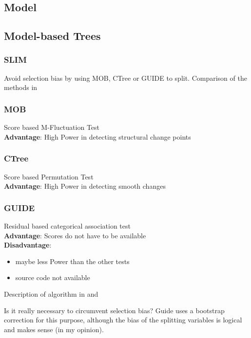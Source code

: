 \subsection{Model}

\subsection{Model-based Trees}
\subsubsection{SLIM}
Avoid selection bias by using MOB, CTree or GUIDE to split.
Comparison of the methods in \citep{Schlosser.24.06.2019}

\subsubsection{MOB}
Score based M-Fluctuation Test \\
\textbf{Advantage}: High Power in detecting structural change points

\subsubsection{CTree}
Score based Permutation Test \\
\textbf{Advantage}: High Power in detecting smooth changes

\subsubsection{GUIDE}
Residual based categorical association test\\
\textbf{Advantage}: Scores do not have to be available\\
\textbf{Disadvantage}: 
\begin{itemize}
    \item maybe less Power than the other tests
    \item source code not available \citep{Loh.2014}
\end{itemize}

Description of algorithm in \citep{Loh.2009} and \citep{.2002}

Is it really necessary to circumvent selection bias? Guide uses a bootstrap correction for this purpose, although the bias of the splitting variables is logical and makes sense (in my opinion).


